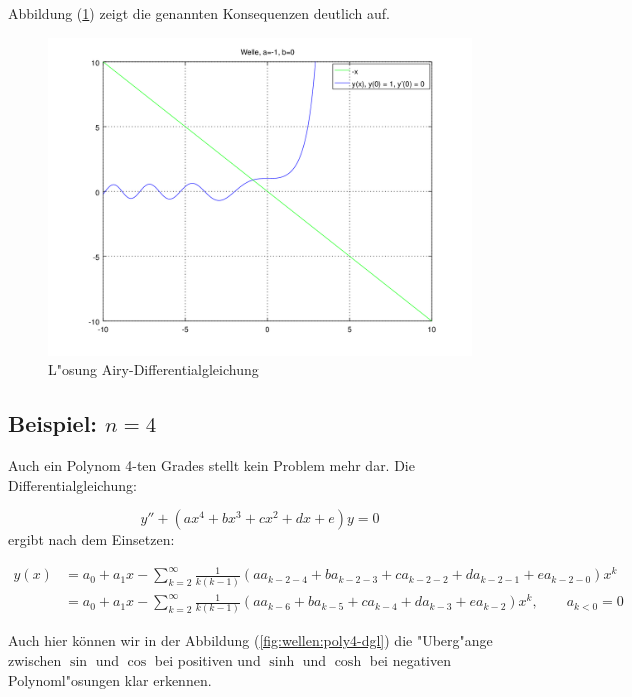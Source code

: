 Abbildung (\ref{fig:wellen:airy-dgl}) zeigt die genannten Konsequenzen deutlich 
auf.

\begin{figure}
	\includegraphics[scale=0.65]{./wellen/images/allgemein/n1.png}
	\caption{L"osung Airy-Differentialgleichung}
	\label{fig:wellen:airy-dgl}
\end{figure}

\subsection{Beispiel: \texorpdfstring{$n = 4$}{n = 4}}

Auch ein Polynom 4-ten Grades stellt kein Problem mehr dar. Die 
Differentialgleichung:

\begin{equation*}
	y''+(ax^4+bx^3+cx^2+dx+e)y = 0
\end{equation*}
ergibt nach dem Einsetzen:

\begin{align*}
	y(x) &= a_0+a_1x-\sum_{k=2}^{\infty} \frac{1}{k(k-1)} (aa_{k-2-4} + 
	ba_{k-2-3} + ca_{k-2-2} + da_{k-2-1} +ea_{k-2-0})x^k
	\\
	&= a_0+a_1x-\sum_{k=2}^{\infty} \frac{1}{k(k-1)} (aa_{k-6} + ba_{k-5} + 
	ca_{k-4} + da_{k-3} +ea_{k-2})x^k, \qquad a_{k<0} = 0
\end{align*}

Auch hier können wir in der Abbildung (\ref{fig:wellen:poly4-dgl}) die 
"Uberg"ange zwischen $\sin$ und $\cos$ bei positiven und $\sinh$ und $\cosh$ 
bei negativen Polynoml"osungen klar erkennen.


